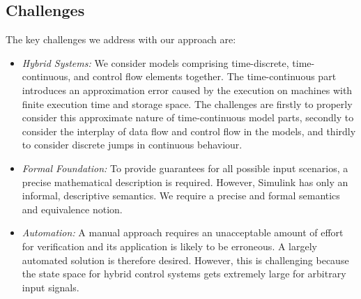 \documentclass[conference]{IEEEtran}
\begin{document}
\subsection*{Challenges}
The key challenges we address with our approach are:
\begin{itemize}[itemsep=0pt]
\item \emph{Hybrid Systems:} We consider models comprising time-discrete, time-continuous, and control flow elements together. The time-continuous part introduces an approximation error caused by the execution on machines with finite execution time and storage space. The challenges are firstly to properly consider this approximate nature  of time-continuous model parts, secondly to consider the interplay of data flow and control flow in the models, and thirdly to consider discrete jumps in continuous behaviour.%
\item \emph{Formal Foundation:} To provide guarantees for all possible input scenarios, a precise mathematical description is required.  %
However, Simulink has only an informal, descriptive semantics. We require a precise and formal semantics and equivalence notion.
\item \emph{Automation:} A manual approach requires an unacceptable amount of effort for verification and its application is likely to be erroneous. A largely automated solution is therefore desired. However, this is challenging because the state space for hybrid control systems gets extremely large for arbitrary input signals.
\end{itemize}

\end{document}
